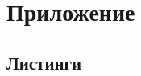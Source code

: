 \documentclass[a4paper]{article}
\begin{document}
\section{Приложение}



\subsection{Листинги}













\end{document}
